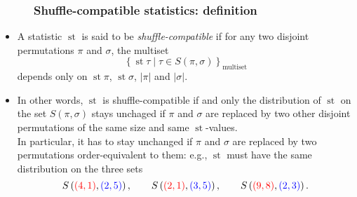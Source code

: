 \documentclass{beamer}
\newcommand{\red}{\color{red}}
\newcommand{\blue}{\color{blue}}
\newcommand{\st}{\operatorname{st}}
\newcommand{\fti}[1]{\frametitle{\ \ \ \ \ #1}}
\newcommand{\set}[1]{\left\{ #1 \right\}}
\newcommand{\abs}[1]{\left| #1 \right|}
\newcommand{\tup}[1]{\left( #1 \right)}
\newcommand{\defn}[1]{{\color{darkred}\emph{#1}}} %
\theoremstyle{plain}
\begin{document}
\begin{frame}
\fti{Shuffle-compatible statistics: definition}

\begin{itemize}

\item A statistic $\st$ is said to be \defn{shuffle-compatible}
      if for any two disjoint permutations $\pi$ and $\sigma$, the
      multiset
      \[
      \set{ \st\tau \mid \tau\in S\tup{\pi, \sigma} }_{\text{multiset}}
      \]
      depends only on $\st \pi$, $\st \sigma$, $\abs{\pi}$ and
      $\abs{\sigma}$.

\pause

\item In other words, $\st$ is shuffle-compatible if and only
      the distribution of
      $\st$ on the set $S \tup{ \pi , \sigma }$
      stays unchaged if $\pi$ and $\sigma$ are replaced by two
      other disjoint permutations of the same size and same $\st$-values.
      \pause \\
      In particular, it has to stay unchanged if $\pi$ and $\sigma$
      are replaced by two permutations order-equivalent to them:
      e.g., $\st$ must have the same distribution
      on the three sets
      \[
      S \tup{ {\red \tup{4, 1}} , {\blue \tup{2, 5}} },
      \qquad S \tup{ {\red \tup{2, 1}} , {\blue \tup{3, 5}} } ,
      \qquad S \tup{ {\red \tup{9, 8}} , {\blue \tup{2, 3}} } .
      \]

\end{itemize}

\end{frame}
\end{document}
